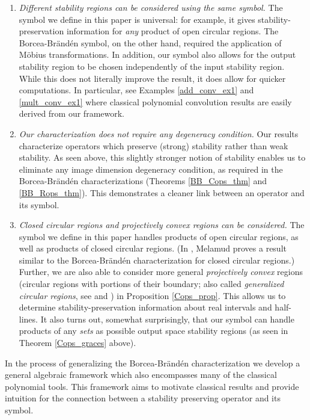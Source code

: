 \documentclass{article}
\theoremstyle{definition}
\theoremstyle{plain}
\begin{document}
\begin{enumerate}
    \item \emph{Different stability regions can be considered using the same symbol.} The symbol we define in this paper is universal: for example, it gives stability-preservation information for \emph{any} product of open circular regions. The Borcea-Br{\"a}nd{\'e}n symbol, on the other hand, required the application of M{\"o}bius transformations. In addition, our symbol also allows for the output stability region to be chosen independently of the input stability region. While this does not literally improve the result, it does allow for quicker computations. In particular, see Examples \ref{add_conv_ex1} and \ref{mult_conv_ex1} where classical polynomial convolution results are easily derived from our framework.
    
    \item \emph{Our characterization does not require any degeneracy condition.} Our results characterize operators which preserve (strong) stability rather than weak stability. As seen above, this slightly stronger notion of stability enables us to eliminate any image dimension degeneracy condition, as required in the Borcea-Br{\"a}nd{\'e}n characterizations (Theorems \ref{BB_Cops_thm} and \ref{BB_Rops_thm}). This demonstrates a cleaner link between an operator and its symbol.
    
    \item \emph{Closed circular regions and projectively convex regions can be considered.} The symbol we define in this paper handles products of open circular regions, as well as products of closed circular regions. (In \cite{melamud2015ops}, Melamud proves a result similar to the Borcea-Br{\"a}nd{\'e}n characterization for closed circular regions.) Further, we are also able to consider more general \emph{projectively convex} regions (circular regions with portions of their boundary; also called \emph{generalized circular regions}, see \cite{zervos1960aspects} and \cite{zaheer1976polar}) in Proposition \ref{Cops_prop}. This allows us to determine stability-preservation information about real intervals and half-lines. It also turns out, somewhat surprisingly, that our symbol can handle products of any \emph{sets} as possible output space stability regions (as seen in Theorem \ref{Cops_graces} above).
\end{enumerate}

In the process of generalizing the Borcea-Br{\"a}nd{\'e}n characterization we develop a general algebraic framework which also encompasses many of the classical polynomial tools. This framework aims to motivate classical results and provide intuition for the connection between a stability preserving operator and its symbol.
\end{document}
